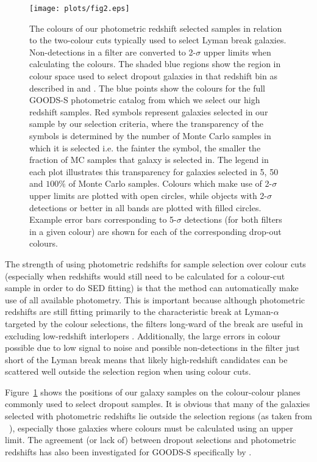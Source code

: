 \begin{figure}
\texttt{[image: plots/fig2.eps]}
\caption{The colours of our photometric redshift selected samples in relation to the two-colour cuts typically used to select Lyman break galaxies. Non-detections in a filter are converted to 2-$\sigma$ upper limits when calculating the colours. The shaded blue regions show the region in colour space used to select dropout galaxies in that redshift bin as described in  \citet{2007ApJ...670..928B} and \citet{2012ApJ...754...83B}. The blue points show the colours for the full GOODS-S photometric catalog from which we select our high redshift samples. Red symbols represent galaxies selected in our sample by our selection criteria, where the transparency of the symbols is determined by the number of Monte Carlo samples in which it is selected i.e. the fainter the symbol, the smaller the fraction of MC samples that galaxy is selected in. The legend in each plot illustrates this transparency for galaxies selected in 5, 50 and $100\%$ of Monte Carlo samples. Colours which make use of 2-$\sigma$ upper limits are plotted with open circles, while objects with 2-$\sigma$ detections or better in all bands are plotted with filled circles. Example error bars corresponding to 5-$\sigma$ detections (for both filters in a given colour) are shown for each of the corresponding drop-out colours.}
\label{fig:colours}
\end{figure}

The strength of using photometric redshifts for sample selection over colour cuts (especially when redshifts would still need to be calculated for a colour-cut sample in order to do SED fitting) is that the method can automatically make use of all available photometry. This is important because although photometric redshifts are still fitting primarily to the characteristic break at Lyman-$\alpha$ targeted by the colour selections, the filters long-ward of the break are useful in excluding low-redshift interlopers \citep{2011MNRAS.418.2074M}. Additionally, the large errors in colour possible due to low signal to noise and possible non-detections in the filter just short of the Lyman break means that likely high-redshift candidates can be scattered well outside the selection region when using colour cuts. 

Figure~\ref{fig:colours} shows the positions of our galaxy samples on the colour-colour planes commonly used to select dropout samples. It is obvious that many of the galaxies selected with photometric redshifts lie outside the selection regions (as taken from \citeauthor{2007ApJ...670..928B}~\citeyear{2007ApJ...670..928B}), especially those galaxies where colours must be calculated using an upper limit. The agreement (or lack of) between dropout selections and photometric redshifts has also been investigated for GOODS-S specifically by \citet{2010ApJ...724..425D}.

